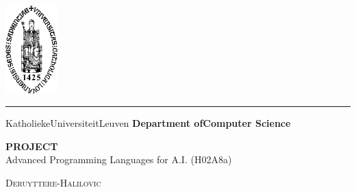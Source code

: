 \documentclass{report}
\begin{document}
\lstset{language=Prolog}          %

\begin{titlepage}
	\newpage
	\thispagestyle{empty}
	\frenchspacing
	\hspace{-0.2cm}
	\includegraphics[height=3.4cm]{sedes}
	\hspace{0.2cm}
	\rule{0.5pt}{3.4cm}
	\hspace{0.2cm}
	\begin{minipage}[b]{8cm}
		\Large{Katholieke\newline Universiteit\newline Leuven}\smallskip\newline
		\large{}\smallskip\newline
		\textbf{Department of\newline Computer Science}\smallskip
	\end{minipage}
	\vspace*{3.2cm}\vfill
	\begin{center}
		\begin{minipage}[t]{\textwidth}
			\begin{center}
				\LARGE{\rm{\textbf{\uppercase{Project}}}}\\
				\Large{\rm{Advanced Programming Languages for A.I. (H02A8a) }}\\
				\vspace{0.5cm}
			   
			    \large{\textsc{Deruyttere-Halilovic}}%
				
			\end{center}
		\end{minipage}
	\end{center}
	\vfill
	\hfill{}
\end{titlepage}
\end{document}
